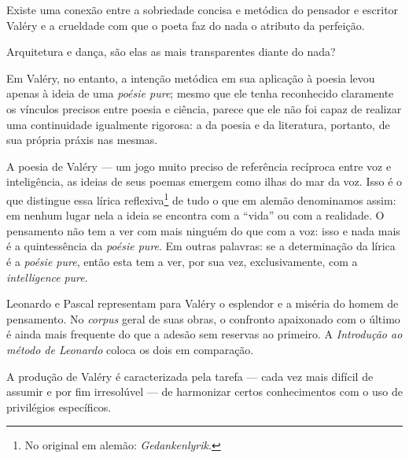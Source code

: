 Existe uma conexão entre a sobriedade concisa e metódica do
pensador e escritor Valéry e a crueldade com que o poeta faz do nada o
atributo da perfeição.

Arquitetura e dança, são elas as mais transparentes diante do nada?

Em Valéry, no entanto, a intenção metódica em sua aplicação à poesia
levou apenas à ideia de uma \emph{poésie pure}; mesmo que ele tenha
reconhecido claramente os vínculos precisos entre poesia e ciência,
parece que ele não foi capaz de realizar uma continuidade igualmente
rigorosa: a da poesia e da literatura, portanto, de sua própria práxis
nas mesmas.

A poesia de Valéry --- um jogo muito preciso de referência recíproca entre
voz e inteligência, as ideias de seus poemas emergem como ilhas do mar
da voz. Isso é o que distingue essa lírica reflexiva\footnote{No
  original em alemão: \emph{Gedankenlyrik}. \versal{[N.~T.]}} de tudo o que em alemão denominamos
assim: em nenhum lugar nela a ideia se encontra com a ``vida'' ou com a
realidade. O pensamento não tem a ver com mais ninguém do que com a voz:
isso e nada mais é a quintessência da \emph{poésie pure}. Em outras
palavras: se a determinação da lírica é a \emph{poésie pure}, então esta
tem a ver, por sua vez, exclusivamente, com a \emph{intelligence}
\emph{pure}.

Leonardo e Pascal representam para Valéry o esplendor e a miséria do
homem de pensamento. No \emph{corpus} geral de suas obras, o confronto
apaixonado com o último é ainda mais frequente do que a adesão sem
reservas ao primeiro. A \emph{Introdução ao método de Leonardo} coloca os
dois em comparação.

A produção de Valéry é caracterizada pela tarefa --- cada vez mais
difícil de assumir e por fim irresolúvel --- de harmonizar certos
conhecimentos com o uso de privilégios específicos.


\pagebreak
\thispagestyle{empty}